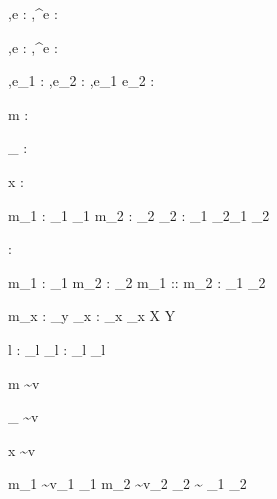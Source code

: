   {\Gamma,\Sigma \infers e : \Reference \beta}
  {\Gamma,\Sigma \infers \Change^\nu e : }
  {}

  {\Gamma,\Sigma \infers e : \Reference \beta}
  {\Gamma,\Sigma \infers \Watch^\nu e : }
  {}

  {\Gamma,\Sigma \infers e_1 : \Reference \beta \Quad
   \Gamma,\Sigma \infers e_2 : \beta}
  {\Gamma,\Sigma \infers e_1 \Assign e_2 : \shaded{\Task\ \record{}}}
  {}



  {\infers m : \tau \To \Delta}


  {}
  {\infers \_ : \tau \To \nothing}
  {}

  {}
  {\infers x : \tau \To {}}
  {}

  {\infers m_1 : \tau_1 \To \Delta_1 \Quad
   \infers m_2 : \tau_2 \To \Delta_2}
  {\infers {} : \tau_1 \times \tau_2\To \Delta_1 \cup \Delta_2}
  {}

  {}
  {\infers \unit : \Unit \To \nothing}
  {}

  {\infers m_1 : \tau \To \Delta_1 \Quad
   \infers m_2 : \List \tau \To \Delta_2}
  {\infers m_1 :: m_2 : \List \tau \To \Delta_1 \cup \Delta_2}
  {}

  { \Quad
   \infers m_x : \tau_y \To \Delta_x}
  {\infers {} :  \To \bigcup_x \Delta_x}
  {X \subseteq Y}

  { \Quad
   \infers l : \tau_l \To \Delta_l}
  {\infers {} :  \To \bigcup_l \Delta_l}
  {}



  {m \sim v \To \theta}


  {}
  {\_ \sim v \To []}
  {}

  {}
  {x \sim v \To [x \mapsto v]}
  {}

  {m_1 \sim v_1 \To \theta_1 \Quad
   m_2 \sim v_2 \To \theta_2}
  { \sim {} \To \theta_1 \circ \theta_2}
  {}

